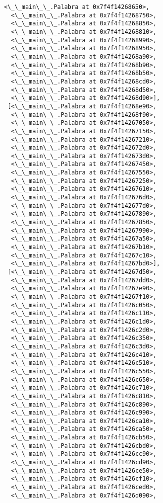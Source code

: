 \documentclass[12pt,a4paper,table]{article}
\begin{document}
\begin{tcolorbox}[breakable, size=fbox, boxrule=.5pt, pad at break*=1mm, opacityfill=0]
\begin{Verbatim}[commandchars=\\\{\}]
  <\_\_main\_\_.Palabra at 0x7f4f14268650>,
  <\_\_main\_\_.Palabra at 0x7f4f14268750>,
  <\_\_main\_\_.Palabra at 0x7f4f14268850>,
  <\_\_main\_\_.Palabra at 0x7f4f14268810>,
  <\_\_main\_\_.Palabra at 0x7f4f14268990>,
  <\_\_main\_\_.Palabra at 0x7f4f14268950>,
  <\_\_main\_\_.Palabra at 0x7f4f14268a90>,
  <\_\_main\_\_.Palabra at 0x7f4f14268b90>,
  <\_\_main\_\_.Palabra at 0x7f4f14268b50>,
  <\_\_main\_\_.Palabra at 0x7f4f14268cd0>,
  <\_\_main\_\_.Palabra at 0x7f4f14268d50>,
  <\_\_main\_\_.Palabra at 0x7f4f14268d90>],
 [<\_\_main\_\_.Palabra at 0x7f4f14268e90>,
  <\_\_main\_\_.Palabra at 0x7f4f14268f90>,
  <\_\_main\_\_.Palabra at 0x7f4f14267050>,
  <\_\_main\_\_.Palabra at 0x7f4f14267150>,
  <\_\_main\_\_.Palabra at 0x7f4f14267210>,
  <\_\_main\_\_.Palabra at 0x7f4f142672d0>,
  <\_\_main\_\_.Palabra at 0x7f4f142673d0>,
  <\_\_main\_\_.Palabra at 0x7f4f14267450>,
  <\_\_main\_\_.Palabra at 0x7f4f14267550>,
  <\_\_main\_\_.Palabra at 0x7f4f14267250>,
  <\_\_main\_\_.Palabra at 0x7f4f14267610>,
  <\_\_main\_\_.Palabra at 0x7f4f142676d0>,
  <\_\_main\_\_.Palabra at 0x7f4f142677d0>,
  <\_\_main\_\_.Palabra at 0x7f4f14267890>,
  <\_\_main\_\_.Palabra at 0x7f4f14267850>,
  <\_\_main\_\_.Palabra at 0x7f4f14267990>,
  <\_\_main\_\_.Palabra at 0x7f4f14267a50>,
  <\_\_main\_\_.Palabra at 0x7f4f14267b10>,
  <\_\_main\_\_.Palabra at 0x7f4f14267c10>,
  <\_\_main\_\_.Palabra at 0x7f4f14267bd0>],
 [<\_\_main\_\_.Palabra at 0x7f4f14267d50>,
  <\_\_main\_\_.Palabra at 0x7f4f14267dd0>,
  <\_\_main\_\_.Palabra at 0x7f4f14267e90>,
  <\_\_main\_\_.Palabra at 0x7f4f14267f10>,
  <\_\_main\_\_.Palabra at 0x7f4f1426c050>,
  <\_\_main\_\_.Palabra at 0x7f4f1426c110>,
  <\_\_main\_\_.Palabra at 0x7f4f1426c1d0>,
  <\_\_main\_\_.Palabra at 0x7f4f1426c2d0>,
  <\_\_main\_\_.Palabra at 0x7f4f1426c350>,
  <\_\_main\_\_.Palabra at 0x7f4f1426c3d0>,
  <\_\_main\_\_.Palabra at 0x7f4f1426c410>,
  <\_\_main\_\_.Palabra at 0x7f4f1426c510>,
  <\_\_main\_\_.Palabra at 0x7f4f1426c550>,
  <\_\_main\_\_.Palabra at 0x7f4f1426c650>,
  <\_\_main\_\_.Palabra at 0x7f4f1426c710>,
  <\_\_main\_\_.Palabra at 0x7f4f1426c810>,
  <\_\_main\_\_.Palabra at 0x7f4f1426c890>,
  <\_\_main\_\_.Palabra at 0x7f4f1426c990>,
  <\_\_main\_\_.Palabra at 0x7f4f1426ca10>,
  <\_\_main\_\_.Palabra at 0x7f4f1426ca50>,
  <\_\_main\_\_.Palabra at 0x7f4f1426cb50>,
  <\_\_main\_\_.Palabra at 0x7f4f1426cbd0>,
  <\_\_main\_\_.Palabra at 0x7f4f1426cc90>,
  <\_\_main\_\_.Palabra at 0x7f4f1426cd90>,
  <\_\_main\_\_.Palabra at 0x7f4f1426ce50>,
  <\_\_main\_\_.Palabra at 0x7f4f1426cf10>,
  <\_\_main\_\_.Palabra at 0x7f4f1426ced0>,
  <\_\_main\_\_.Palabra at 0x7f4f1426d090>,

\end{Verbatim}
\end{tcolorbox}
\end{document}
